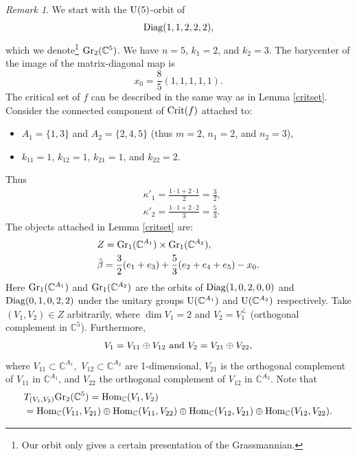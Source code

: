 \documentclass[12pt]{amsart}
\theoremstyle{definition}
\theoremstyle{remark}
\newtheorem{rem}[thm]{Remark}
\newcommand{\CC}{\mathbb C}
\begin{document}
\begin{rem}
 We start with the  ${\rm U}(5)$-orbit of
 $${\rm Diag} (1,1,2,2,2),$$ which we denote\footnote{Our orbit only gives  a certain presentation of the Grassmannian.}  ${\rm Gr}_2(\CC^5)$.  
 We have $n=5$, $k_1=2$, and $k_2=3$.  The barycenter of the image of the matrix-diagonal map is
 $$x_0=\frac{8}{5}(1,1,1,1,1).$$
 The critical set of $f$ can be described in the same way as in Lemma \ref{critset}. 
 Consider the connected component of ${\rm Crit}(f)$ attached to:
 \begin{itemize}
 \item $A_1=\{1,3\}$ and $A_2=\{2,4,5\}$ (thus $m=2$, $n_1=2$, and $n_2=3$),
 \item $k_{11}=1$, $k_{12}=1$, $k_{21}=1$, and $k_{22}=2$.
 \end{itemize}
 Thus 
 \begin{align*}
 {}& \kappa'_1=\frac{1\cdot 1 + 2\cdot 1}{2}=\frac{3}{2},\\
 {}& \kappa'_2=\frac{1\cdot 1 + 2 \cdot 2}{3}=\frac{5}{3}.
 \end{align*}
 The objects attached in Lemma \ref{critset} are:
 \begin{align*}
 {}& Z = {\rm Gr}_1(\CC^{A_1}) \times {\rm Gr}_1(\CC^{A_2}),\\
 {}& \tilde{\beta}= \frac{3}{2}(e_1+e_3) + \frac{5}{3}(e_2+e_4+e_5)- x_0.
 \end{align*}
 Here ${\rm Gr}_1(\CC^{A_1})$ and ${\rm Gr}_1(\CC^{A_2})$ are the orbits of ${\rm Diag}(1,0, 2,0,0)$ and ${\rm Diag}(0, 1,0, 2,2)$ under
 the unitary groups ${\rm U} (\CC^{A_1})$ and ${\rm U} (\CC^{A_2})$ respectively. 
Take $(V_1, V_2)\in Z$ arbitrarily, where $\dim V_1=2$ and $V_2=V_1^\perp$ (orthogonal complement in $\CC^5$). Furthermore,
$$V_1=V_{11}\oplus V_{12} \ {\rm and} \ V_2=V_{21}\oplus V_{22},$$
where $V_{11}\subset \CC^{A_1},$ $V_{12}\subset \CC^{A_2}$ are 1-dimensional, $V_{21}$ is the orthogonal complement
of $V_{11}$ in $\CC^{A_1}$, and $V_{22}$  the orthogonal complement
of $V_{12}$ in $\CC^{A_2}$. 
Note that
\begin{align} \label{tvb} {}& T_{(V_1, V_2)}{\rm Gr}_2(\CC^5)= {\rm Hom}_\CC(V_1, V_2) \\  \nonumber
{}&= {\rm Hom}_\CC(V_{11}, V_{21}) \oplus {\rm Hom}_\CC(V_{11}, V_{22}) 
\oplus {\rm Hom}_\CC(V_{12}, V_{21}) 
\oplus {\rm Hom}_\CC(V_{12}, V_{22}).\end{align}


\end{rem}
\end{document}

